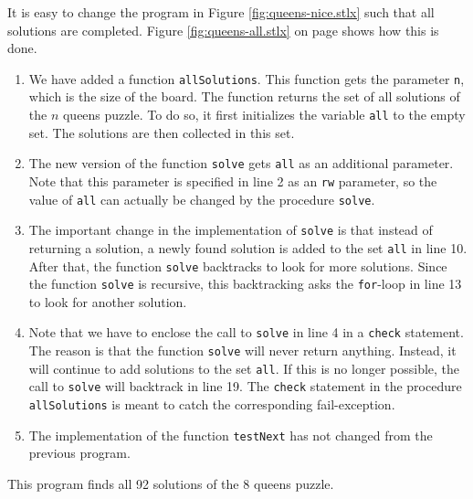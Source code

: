 It is easy to change the program in Figure \ref{fig:queens-nice.stlx} such that all
solutions are completed.   Figure \ref{fig:queens-all.stlx} on page
\pageref{fig:queens-all.stlx} shows how this is done.
\begin{enumerate}
\item We have added a function \texttt{allSolutions}.  This function gets the parameter
      \texttt{n}, which is the size of the board.
      The function returns the set of all solutions of the $n$ queens puzzle.
      To do so, it first initializes the variable \texttt{all} to the empty set.
      The solutions are then collected in this set.
\item The new version of the function \texttt{solve} gets \texttt{all} as an additional parameter.
      Note that this parameter is specified in line 2 as an \texttt{rw} parameter, so 
      the value of \texttt{all} can actually be changed by the procedure \texttt{solve}.
\item The important change in the implementation of \texttt{solve} is that instead of
      returning a solution,  a newly found solution is added to the set \texttt{all} in
      line 10. After that, the function \texttt{solve} backtracks to look for more
      solutions.   Since the function \texttt{solve} is recursive, this backtracking asks the
      \texttt{for}-loop in line 13 to look for another solution.
\item Note that we have to enclose the call to \texttt{solve} in line 4 in a \texttt{check}
      statement.  The reason is that the function \texttt{solve} will never return anything.
      Instead, it will continue to add solutions to the set \texttt{all}.   If this is no longer
      possible, the call to \texttt{solve} will backtrack in line 19.  The \texttt{check} statement 
      in the procedure \texttt{allSolutions} is meant to catch the corresponding fail-exception.
\item The implementation of the function \texttt{testNext} has not changed from the previous program.
\end{enumerate}
This program finds all 92 solutions of the $8$ queens puzzle.


